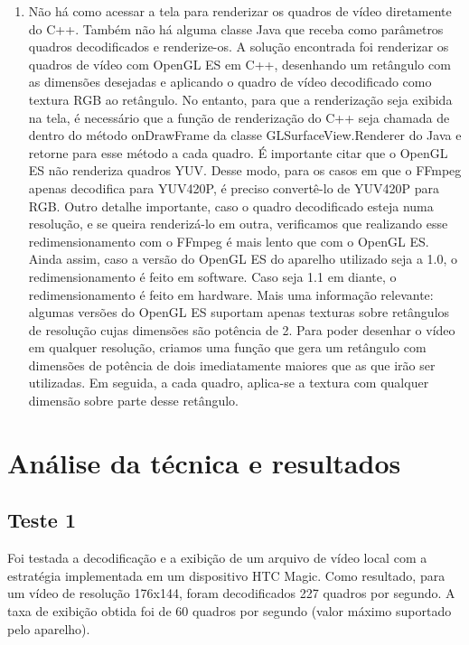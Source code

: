 \documentclass{acm_proc_article-sp}
\begin{document}
\begin{enumerate}
 \item Não há como acessar a tela para renderizar os quadros de vídeo diretamente do C++. Também não há alguma classe Java que receba como parâmetros quadros decodificados e renderize-os. A solução encontrada foi renderizar os quadros de vídeo com OpenGL ES \cite{opengl} em C++, desenhando um retângulo com as dimensões desejadas e aplicando o quadro de vídeo decodificado como textura RGB ao retângulo. No entanto, para que a renderização seja exibida na tela, é necessário que a função de renderização do C++ seja chamada de dentro do método onDrawFrame da classe GLSurfaceView.Renderer do Java e retorne para esse método a cada quadro. É importante citar que o OpenGL ES não renderiza quadros YUV. Desse modo, para os casos em que o FFmpeg apenas decodifica para YUV420P, é preciso convertê-lo de YUV420P para RGB. Outro detalhe importante, caso o quadro decodificado esteja numa resolução, e se queira renderizá-lo em outra, verificamos que realizando esse redimensionamento com o FFmpeg é mais lento que com o OpenGL ES. Ainda assim, caso a versão do OpenGL ES do aparelho utilizado seja a 1.0, o redimensionamento é feito em software. Caso seja 1.1 em diante, o redimensionamento é feito em hardware. Mais uma informação relevante: algumas versões do OpenGL ES suportam apenas texturas sobre retângulos de resolução cujas dimensões são potência de 2. Para poder desenhar o vídeo em qualquer resolução, criamos uma função que gera um retângulo com dimensões de potência de dois imediatamente maiores que as que irão ser utilizadas. Em seguida, a cada quadro, aplica-se a textura com qualquer dimensão sobre parte desse retângulo.
\end{enumerate}

\section{Análise da técnica e resultados}
\subsection{Teste 1}
Foi testada a decodificação e a exibição de um arquivo de vídeo local com a estratégia implementada em um dispositivo HTC Magic. Como resultado, para um vídeo de resolução 176x144, foram decodificados 227 quadros por segundo. A taxa de exibição obtida foi de 60 quadros por segundo (valor máximo suportado pelo aparelho).
\end{document}
